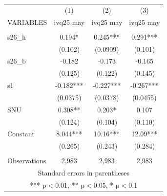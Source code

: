 \documentclass[]{article}
\begin{document}
\begin{tabular}{lccc} \hline
 & (1) & (2) & (3) \\
VARIABLES & ivq25 may & ivq25 may & ivq25 may \\ \hline
 &  &  &  \\
s26\_h & 0.194* & 0.245*** & 0.291*** \\
 & (0.102) & (0.0909) & (0.101) \\
s26\_b & -0.182 & -0.173 & -0.165 \\
 & (0.125) & (0.122) & (0.145) \\
s1 & -0.182*** & -0.227*** & -0.267*** \\
 & (0.0375) & (0.0378) & (0.0455) \\
SNU & 0.308** & 0.203* & 0.107 \\
 & (0.124) & (0.104) & (0.110) \\
Constant & 8.044*** & 10.16*** & 12.09*** \\
 & (0.265) & (0.243) & (0.284) \\
 &  &  &  \\
 Observations & 2,983 & 2,983 & 2,983 \\ \hline
\multicolumn{4}{c}{ Standard errors in parentheses} \\
\multicolumn{4}{c}{ *** p$<$0.01, ** p$<$0.05, * p$<$0.1} \\
\end{tabular}
\end{document}
